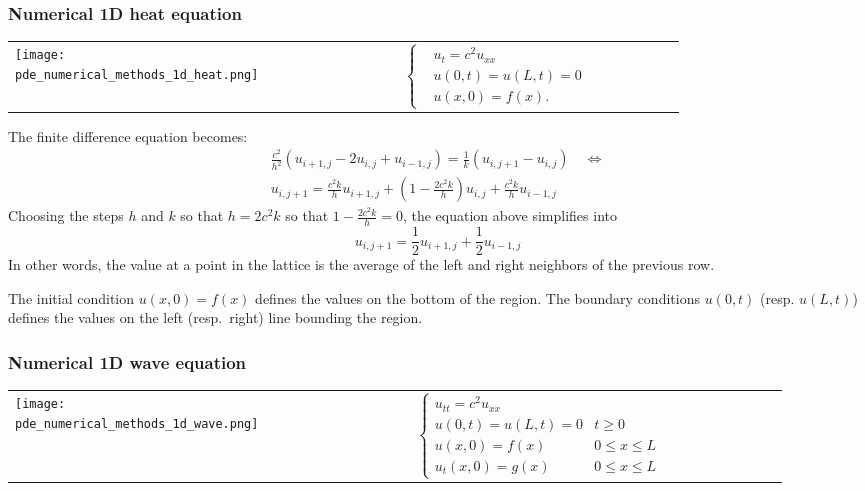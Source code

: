 \subsubsection{Numerical 1D heat equation}

\begin{tabular}{ m{0.33\linewidth}  m{0.45\linewidth} }
    {
        \texttt{[image: pde\_numerical\_methods\_1d\_heat.png]}
    }
     &
    {
            \begin{equation*}
                \begin{cases}
                     & u_t=c^2u_{xx}   \\
                     & u(0,t)=u(L,t)=0 \\
                     & u(x,0)=f(x).
                \end{cases}
            \end{equation*}
        }
\end{tabular}

The finite difference equation becomes:
\begin{gather*}
    \frac{c^2}{h^2}(u_{i+1,j}-2u_{i,j}+u_{i-1,j})=\frac1k(u_{i,j+1}-u_{i,j}) \quad \Leftrightarrow \\
    u_{i,j+1}=\frac{c^2k}{h}u_{i+1,j}+\left(1-\frac{2c^2k}{h}\right)u_{i,j}+\frac{c^2k}{h}u_{i-1,j}
\end{gather*}
Choosing the steps $h$ and $k$ so that $h=2c^2k$ so that $1-\frac{2c^2k}{h}=0$, the equation above simplifies into
\begin{equation*}
    u_{i,j+1}=\frac{1}{2}u_{i+1,j}+\frac{1}{2}u_{i-1,j}
\end{equation*}
In other words, the value at a point in the lattice is the average of the left and right neighbors of the previous row.

The initial condition $u(x, 0) = f(x)$ defines the values on the bottom of the region. The boundary conditions $u(0, t)$ (resp. $u(L, t)$) defines the values on the left (resp.\ right) line bounding the region.

\subsubsection{Numerical 1D wave equation}

\begin{tabular}{ m{0.33\linewidth}  m{0.57\linewidth} }
    {
        \texttt{[image: pde\_numerical\_methods\_1d\_wave.png]}
    }
     &
    {
            \begin{equation*}
                \begin{cases}
                    u_{tt}=c^2u_{xx}                \\
                    u(0,t)=u(L,t)=0 & t\geq0        \\
                    u(x,0)=f(x)     & 0\leq x\leq L \\
                    u_t(x,0)=g(x)   & 0\leq x\leq L
                \end{cases}
            \end{equation*}
        }
\end{tabular}

